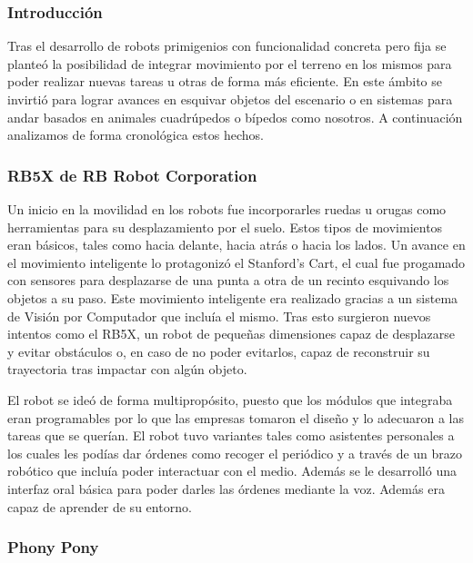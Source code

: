\subsubsection{Introducción}

Tras el desarrollo de robots primigenios con funcionalidad concreta pero fija se planteó la posibilidad de integrar movimiento por el terreno en los mismos para poder realizar nuevas tareas u otras de forma más eficiente. En este ámbito se invirtió para lograr avances en esquivar objetos del escenario o en sistemas para andar basados en animales cuadrúpedos o bípedos como nosotros. A continuación analizamos de forma cronológica estos hechos.

\subsubsection{RB5X de RB Robot Corporation}
Un inicio en la movilidad en los robots fue incorporarles ruedas u orugas como herramientas para su desplazamiento por el suelo. Estos tipos de movimientos eran básicos, tales como hacia delante, hacia atrás o hacia los lados. Un avance en el movimiento inteligente lo protagonizó el Stanford's Cart, el cual fue progamado con sensores para desplazarse de una punta a otra de un recinto esquivando los objetos a su paso. Este movimiento inteligente era realizado gracias a un sistema de Visión por Computador que incluía el mismo. Tras esto surgieron nuevos intentos como el RB5X, un robot de pequeñas dimensiones capaz de desplazarse y evitar obstáculos o, en caso de no poder evitarlos, capaz de reconstruir su trayectoria tras impactar con algún objeto.

\vspace{10px}

El robot se ideó de forma multipropósito, puesto que los módulos que integraba eran programables por lo que las empresas tomaron el diseño y lo adecuaron a las tareas que se querían. El robot tuvo variantes tales como asistentes personales a los cuales les podías dar órdenes como recoger el periódico y a través de un brazo robótico que incluía poder interactuar con el medio. Además se le desarrolló una interfaz oral básica para poder darles las órdenes mediante la voz. Además era capaz de aprender de su entorno.

\subsubsection{Phony Pony}

